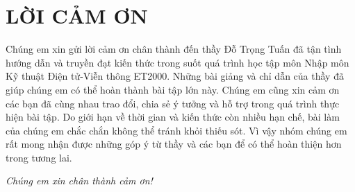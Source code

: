 \section*{LỜI CẢM ƠN}
\thispagestyle{empty}
Chúng em xin gửi lời cảm ơn chân thành đến thầy Đỗ Trọng Tuấn đã tận tình hướng dẫn và truyền đạt kiến thức trong suốt quá trình học tập môn Nhập môn Kỹ thuật Điện tử-Viễn thông ET2000. Những bài giảng và chỉ dẫn của thầy đã giúp chúng em có thể hoàn thành bài tập lớn này. Chúng em cũng xin cảm ơn các bạn đã cùng nhau trao đổi, chia sẻ ý tưởng và hỗ trợ trong quá trình thực hiện bài tập. Do giới hạn về thời gian và kiến thức còn nhiều hạn chế, bài làm của chúng em chắc chắn không thể tránh khỏi thiếu sót. Vì vậy nhóm chúng em rất mong nhận được những góp ý từ thầy và các bạn để có thể hoàn thiện hơn trong tương lai. 
\begin{flushright}
    \textit{Chúng em xin chân thành cảm ơn!}
\end{flushright}
\cleardoublepage